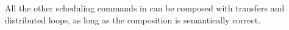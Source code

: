 
All the other scheduling commands in \framework{} can be composed with transfers and distributed loops, as long as the composition is semantically correct. 

